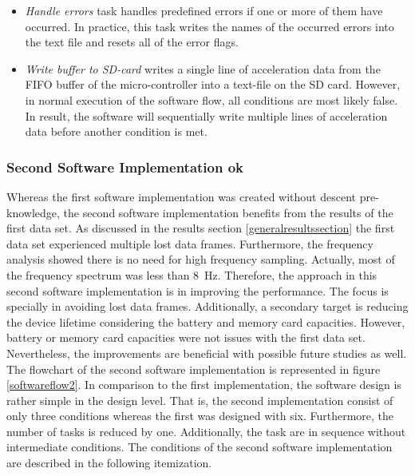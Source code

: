 \documentclass[english,12pt,a4paper,pdftex,elec,utf8]{aaltothesis}
\begin{document}
\begin{itemize}
\item \textit{Handle errors} task handles predefined errors if one or more of them have occurred. In practice, this task writes the names of the occurred errors into the text file and resets all of the error flags.

\item \textit{Write buffer to SD-card} writes a single line of acceleration data from the FIFO buffer of the micro-controller into a text-file on the SD card. However, in normal execution of the software flow, all conditions are most likely false. In result, the software will sequentially write multiple lines of acceleration data before another condition is met.
\end{itemize}




\subsubsection*{Second Software Implementation ok}\label{seconddatasetconfigurations}


Whereas the first software implementation was created without descent pre-knowledge, the second software implementation benefits from the results of the first data set. As discussed in the results section \ref{generalresultssection} the first data set experienced multiple lost data frames. Furthermore, the frequency analysis showed there is no need for high frequency sampling. Actually, most of the frequency spectrum was less than \SI{8}{\hertz}. Therefore, the approach in this second software implementation is in improving the performance. The focus is specially in avoiding lost data frames. Additionally, a secondary target is reducing the device lifetime considering the battery and memory card capacities. However, battery or memory card capacities were not issues with the first data set. Nevertheless, the improvements are beneficial with possible future studies as well. The flowchart of the second software implementation is represented in figure \ref{softwareflow2}. In comparison to the first implementation, the software design is rather simple in the design level. That is, the second implementation consist of only three conditions whereas the first was designed with six. Furthermore, the number of tasks is reduced by one. Additionally, the task are in sequence without intermediate conditions. The conditions of the second software implementation are described in the following itemization.
\end{document}
